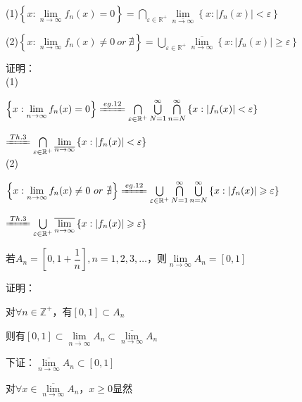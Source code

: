 \begin{eg}
\par (1)$\left\{x : \lim \limits_{n \to \infty}f_{n}(x) = 0\right\} = \bigcap \limits_{\varepsilon  \in \mathbb{R}^{+}} \lim \limits_{\overline{n \to \infty}}\left\{x : \left\lvert f_{n}(x)\right\rvert < \varepsilon \right\}$
\par (2)$\left\{x : \lim \limits_{n \to \infty}f_{n}(x) \neq 0 \ or \ \nexists \right\} = \bigcup  \limits_{\varepsilon  \in \mathbb{R}^{+}} \overline{\lim \limits_{n \to \infty}}\left\{x : \left\lvert f_{n}(x)\right\rvert \geqslant \varepsilon \right\}$    
\end{eg}
\noindent 证明：
\\(1)
\par $\left\{x : \lim \limits_{n \to \infty}f_{n}(x) = 0\right\} \xlongequal{eg.12} \bigcap \limits_{\varepsilon  \in \mathbb{R}^{+}}\bigcup \limits_{N=1}^{\infty}\bigcap \limits_{n=N}^{\infty}\left\{x : \left\lvert f_{n}(x)\right\rvert < \varepsilon \right\}$
\par $\xlongequal{Th.3} \bigcap \limits_{\varepsilon  \in \mathbb{R}^{+}} \lim \limits_{\overline{n \to \infty}}\left\{x : \left\lvert f_{n}(x)\right\rvert < \varepsilon \right\}$
\\(2)
\par $\left\{x : \lim \limits_{n \to \infty}f_{n}(x) \neq 0 \ or \ \nexists \right\} \xlongequal{eg.12} \bigcup \limits_{\varepsilon  \in \mathbb{R}^{+}}\bigcap \limits_{N=1}^{\infty}\bigcup \limits_{n=N}^{\infty}\left\{x : \left\lvert f_{n}(x)\right\rvert \geqslant  \varepsilon \right\}$
\par $\xlongequal{Th.3} \bigcup  \limits_{\varepsilon  \in \mathbb{R}^{+}} \overline{\lim \limits_{n \to \infty}}\left\{x : \left\lvert f_{n}(x)\right\rvert \geqslant \varepsilon \right\}$
\begin{eg}
 若$A_{n} = \left[0, 1 + \dfrac{1}{n}\right] ,n = 1,2,3,\dots$，则$\lim \limits_{n \to \infty} A_{n} = \left[0,1\right] $    
\end{eg}
\noindent 证明：
\par 对$\forall n \in \mathbb{Z}^{+}$，有$\left[0,1\right] \subset A_{n}$
\par 则有$\left[0,1\right] \subset \lim \limits_{\overline{n \to \infty}}A_{n} \subset \overline{\lim \limits_{n \to \infty}}A_{n}$
\par 下证：$\overline{\lim \limits_{n \to \infty}}A_{n} \subset \left[0,1\right]$
\par 对$\forall x \in \overline{\lim \limits_{n \to \infty}}A_{n} $，$x \geqslant 0$显然
